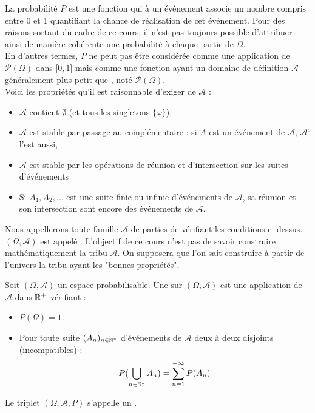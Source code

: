 \documentclass{book}
\begin{document}
\begin{Definition}
La probabilité $P$  est une fonction qui à un événement associe
un nombre compris entre 0 et 1 quantifiant la chance de réalisation
de cet événement. Pour des raisons sortant du cadre de ce cours, il n'est pas
toujours possible d'attribuer ainsi de manière cohérente une probabilité à
chaque partie de $\Omega$.\\
En d'autres termes, $P$ ne peut pas être considérée comme une application de $\mathcal{P}(\Omega)$
 dans $[0, 1$] mais comme une fonction ayant un domaine de définition $\mathcal{A}$ généralement plus
petit que , noté $\mathcal{P}(\Omega)$.\\
Voici les propriétés qu'il est raisonnable d'exiger de $\mathcal{A}$ :
\begin{itemize}
\item  $\mathcal{A}$ contient $\emptyset$ (et tous les singletons $\{\omega\}$),
\item $\mathcal{A}$ est stable par passage au complémentaire : si $A$ est un événement
de $\mathcal{A}$,  $\mathcal{A}^c$ l'est aussi,
\item $\mathcal{A}$ est stable par les opérations de réunion et d'intersection sur les suites
d'événements 
\item Si $A_1,A_2,\ldots$ est une suite finie ou infinie d'événements
de $\mathcal{A}$, sa réunion et son intersection sont encore des événements de $\mathcal{A}$.
\end{itemize}
Nous appellerons  toute famille  $\mathcal{A}$ de parties de  vérifiant les conditions ci-dessus.\\
$(\Omega,\mathcal{A})$ est appelé . L'objectif de ce cours n'est pas de savoir construire mathématiquement la tribu  $\mathcal{A}$. On supposera que l'on sait construire à partir de l'univers la tribu ayant les "bonnes propriétés". 
\end{Definition}
\begin{Definition}
Soit $(\Omega,\mathcal{A})$ un espace probabilisable.
Une  sur $(\Omega,\mathcal{A})$ est une application
de $\mathcal{A}$ dans $\mathbb{R}^+$ vérifiant :
\begin{itemize}
\item
  $P(\Omega)=1$.
\item
  Pour toute suite $(A_n)_{n\in\mathbb{N}^*}$ d'événements de $\mathcal{A}$ deux à deux disjoints (incompatibles) :
$$P(\bigcup_{n\in\mathbb{N}^*}A_n)=\sum_{n=1}^{+\infty}P(A_n)$$  
\end{itemize}
Le triplet  $(\Omega,\mathcal{A},P)$ s'appelle un .
\end{Definition}
\end{document}
